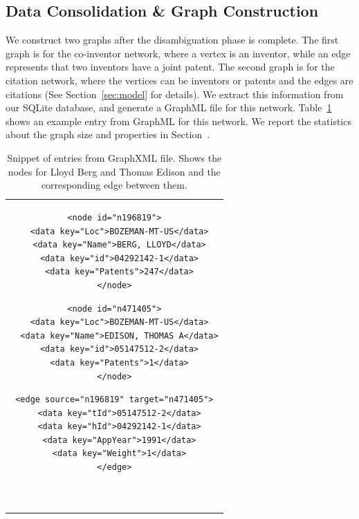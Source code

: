 \subsection{Data Consolidation \& Graph Construction}

We construct two graphs after the disambiguation phase is complete. 
The first graph is for the co-inventor network, where a vertex is an inventor, while an edge represents that two inventors have a joint patent. The second graph is for the citation network, where the vertices can be inventors or patents and the edges are citations (See Section~\ref{sec:model} for details).
We extract this information from our SQLite database, and generate a GraphML file for this network.
Table~\ref{listing} shows an example entry from GraphML for this network.
We report the statistics about the graph size and properties in Section~\cite{sec:eval}.

\begin{table}[h] 
  \centering
  \begin{tabular}{@{}c@{}} 

  \begin{minipage}{0.25\linewidth}

\begin{lstlisting}[]
<node id="n196819">
  <data key="Loc">BOZEMAN-MT-US</data>
  <data key="Name">BERG, LLOYD</data>
  <data key="id">04292142-1</data>
  <data key="Patents">247</data>
</node>
\end{lstlisting}

  \end{minipage}
  \hspace{0.05\linewidth}
  \begin{minipage}{0.3\linewidth}

\begin{lstlisting}[]
<node id="n471405">
  <data key="Loc">BOZEMAN-MT-US</data>
  <data key="Name">EDISON, THOMAS A</data>
  <data key="id">05147512-2</data>
  <data key="Patents">1</data>
</node>
\end{lstlisting}

  \end{minipage}
  \hspace{0.05\linewidth}
  \begin{minipage}{0.3\linewidth}

\begin{lstlisting}[]
<edge source="n196819" target="n471405">
  <data key="tId">05147512-2</data>
  <data key="hId">04292142-1</data>
  <data key="AppYear">1991</data>
  <data key="Weight">1</data>
</edge>



\end{lstlisting}

  \end{minipage}
  
  \end{tabular}

\label{listing}
\caption{\footnotesize Snippet of entries from GraphXML file. Shows the nodes for Lloyd Berg and Thomas Edison and the corresponding edge between them.}
\end{table}